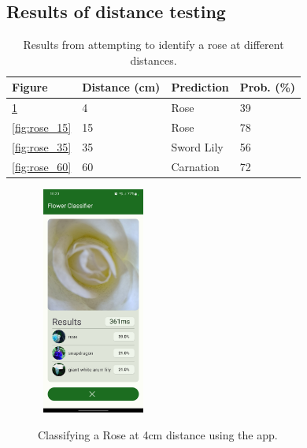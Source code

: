 \documentclass{article}
\begin{document}
\clearpage


\subsection{Results of distance testing}
\label{subsec:distance}

\begin{table}[h!]
    \begin{tabular}{ |m{1cm}|m{2.5cm}|m{2cm}|m{2cm}| }
        \hline
        Figure & Distance (cm) & Prediction & Prob. (\%)\\
        \hline
        \ref{fig:rose_4} & 4 & Rose & 39 \\
        \hline
        \ref{fig:rose_15} & 15 & Rose & 78 \\
        \hline
        \ref{fig:rose_35} & 35 & Sword Lily & 56 \\
        \hline
        \ref{fig:rose_60} & 60 & Carnation & 72 \\ 
        \hline
    \end{tabular}
    \caption{Results from attempting to identify a rose at different distances.}
    \label{table:distance}
\end{table}

\begin{figure}[h]\
    \includegraphics[width=0.3\textwidth]{rose_4cm.jpg}
    \caption{Classifying a Rose at 4cm distance using the app.}
    \label{fig:rose_4}
\end{figure}
\end{document}
